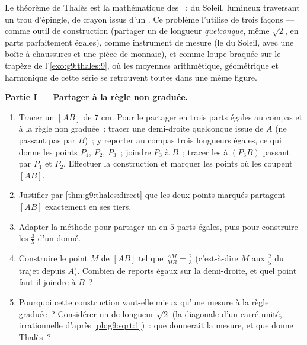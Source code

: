 \begin{problem}
\label{pb:g9:thales:1}
Le théorème de Thalès est la mathématique des \emph{}~: 
du Soleil,  lumineux traversant un trou d'épingle,  de
crayon issus d'un . Ce problème l'utilise de trois façons ---
comme outil de construction (partager un  de longueur
\emph{quelconque}, même $\sqrt2$, en parts parfaitement égales),
comme instrument de mesure (le  du Soleil, avec une boîte à
chaussures et une pièce de monnaie), et comme loupe braquée sur le
trapèze de l'\cref{exo:g9:thales:9}, où les moyennes arithmétique,
géométrique et harmonique de cette série se retrouvent toutes dans
une même figure.

\medskip
\noindent\textbf{Partie I --- Partager à la règle non graduée.}
\begin{enumerate}
  \item Tracer un  $[AB]$ de $7$ cm. Pour le partager en
        trois parts égales au compas et à la règle non graduée~:
        tracer une demi-droite quelconque issue de $A$ (ne passant
        pas par $B$)~; y reporter au compas trois longueurs égales,
        ce qui donne les points $P_1$, $P_2$, $P_3$~; joindre $P_3$
        à $B$~; tracer les  à $(P_3 B)$ passant par $P_1$
        et $P_2$. Effectuer la construction et marquer les points où
        les  coupent $[AB]$.
  \item Justifier par \cref{thm:g9:thales:direct} que les deux
        points marqués partagent $[AB]$ exactement en ses tiers.
  \item Adapter la méthode pour partager un  en $5$ parts
        égales, puis pour construire les $\frac35$ d'un 
        donné.
  \item Construire le point $M$ de $[AB]$ tel que
        $\frac{AM}{MB} = \frac23$ (c'est-à-dire $M$ aux $\frac25$
        du trajet depuis $A$). Combien de reports égaux sur la
        demi-droite, et quel point faut-il joindre à $B$~?
  \item Pourquoi cette construction vaut-elle mieux qu'une mesure à
        la règle graduée~? Considérer un  de longueur
        $\sqrt2$ (la diagonale d'un carré unité, irrationnelle
        d'après \cref{pb:g9:sqrt:1})~: que donnerait la mesure, et
        que donne Thalès~?
\end{enumerate}


\end{problem}
